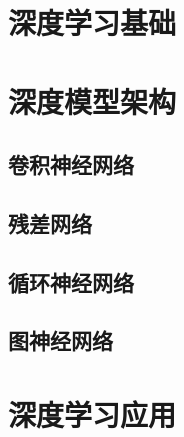 \documentclass[11pt,oneside]{book}
\begin{document}


\tableofcontents


\part{深度学习基础}










\part{深度模型架构}
\chapter{卷积神经网络}


\chapter{残差网络}


\chapter{循环神经网络}


\chapter{图神经网络}


\part{深度学习应用}



\begin{appendices}
	
\end{appendices}
\end{document}
